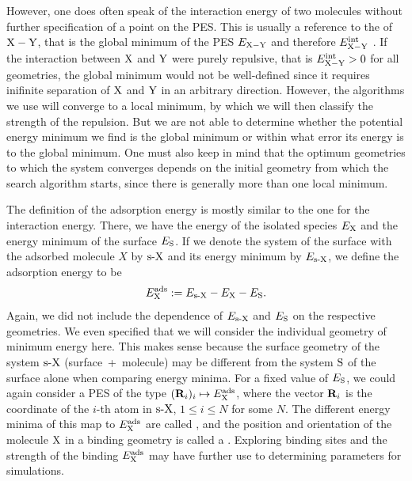 However, one does often speak of the interaction energy of two molecules without further specification
of a point on the PES. This is usually a reference to the 
of $\XY$, that is the global minimum of the PES $E_{\XY}$ and therefore
$\eint_\XY$ . If the interaction between $\X$ and $\Y$ were purely repulsive,
that is $\eint_{\XY} > 0$ for all geometries, the global minimum would not be
well-defined since it requires inifinite separation of $\X$ and $\Y$ in an
arbitrary direction.
However, the algorithms we use will converge to a local minimum, by which we
will then classify the strength of the repulsion. But we are not able to
determine whether the potential energy minimum we find is the global minimum or
within what error its energy is to the global minimum. One must also keep in
mind that the optimum geometries to which the system converges depends on the
initial geometry from which the search algorithm starts, since there is
generally more than one local minimum.

The definition of the adsorption energy is mostly similar to the one
for the interaction energy.
There, we have the energy of the isolated species $E_\X$ and the energy minimum of the
surface $E_{\S}$. If we denote the system of the surface with the adsorbed
molecule $X$ by $\sX$ and its energy minimum by $E_{\sX}$, we define the
adsorption energy to be
\begin{equation}
 \eads_{\X}:= E_{\sX} - E_\X - E_\S.
 \label{Theo:AdsorptionEnergy}
\end{equation}
Again, we did not include the dependence of $E_\sX$ and $E_\S$ on the respective
geometries. We even specified that we will consider the individual geometry of
minimum energy here. This makes sense because the surface geometry of the system
$\sX$ \mbox{(surface + molecule)} may be different from the system $\S$ of the
surface alone when comparing energy minima. For a fixed value of $E_\S$, we
could again consider a PES of the type \mbox{$(\bo R_i)_i \mapsto \eads_\X$},
where the vector $\bo R_i$ is the coordinate of the $i$-th atom in $\sX$, $1 \le
i \le N$ for some $N$. The different energy minima of this map to $\eads_\X$ are
called , and the position and orientation of the
molecule $\X$ in a binding geometry is called a .
Exploring binding sites and the strength of the binding $\eads_\X$ may have
further use to determining parameters for simulations.

